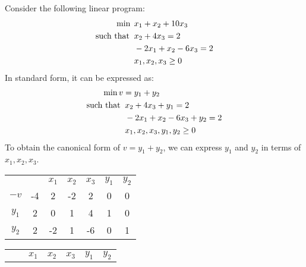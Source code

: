 \begin{example}
    Consider the following linear program: 
    \begin{align*}
        \min                      \:&\: x_1+x_2+10x_3           \\
        \textnormal{such that }     &\: x_2+4x_3=2   \\
                                    &\: -2x_1+x_2-6x_3=2        \\
                                    &\: x_1,x_2,x_3 \geq 0
    \end{align*}
    In standard form, it can be expressed as:
    \begin{align*}
        \min                      v &=  y_1+y_2                 \\
        \textnormal{such that }     &\: x_2+4x_3+y_1=2          \\
                                    &\: -2x_1+x_2-6x_3+y_2=2    \\
                                    &\: x_1,x_2,x_3,y_1,y_2     \geq 0
    \end{align*}
    To obtain the canonical form of $v=y_1+y_2$, we can express $y_1$ and $y_2$ in terms of $x_1,x_2,x_3$. 
    \begin{table}[H]
        \centering
        \begin{tabular}{ccccccc}
                                   &                         & $x_1$ & $x_2$ & $x_3$                   & $y_1$ & $y_2$                  \\ \cline{2-7} 
        \multicolumn{1}{c|}{$-v$}  & \multicolumn{1}{c|}{-4} & 2     & -2    & \multicolumn{1}{c|}{2}  & 0     & \multicolumn{1}{c|}{0} \\ \cline{2-7} 
        \multicolumn{1}{c|}{$y_1$} & \multicolumn{1}{c|}{2}  & 0     & 1     & \multicolumn{1}{c|}{4}  & 1     & \multicolumn{1}{c|}{0} \\
        \multicolumn{1}{c|}{$y_2$} & \multicolumn{1}{c|}{2}  & -2    & 1     & \multicolumn{1}{c|}{-6} & 0     & \multicolumn{1}{c|}{1} \\ \cline{2-7} 
        \end{tabular}
    \end{table}
    \begin{table}[H]
        \centering
        \begin{tabular}{ccccccc}
                                   &                        & $x_1$ & $x_2$ & $x_3$                    & $y_1$ & $y_2$                  \\ \cline{2-7} 

\end{tabular}
\end{table}
\end{example}
